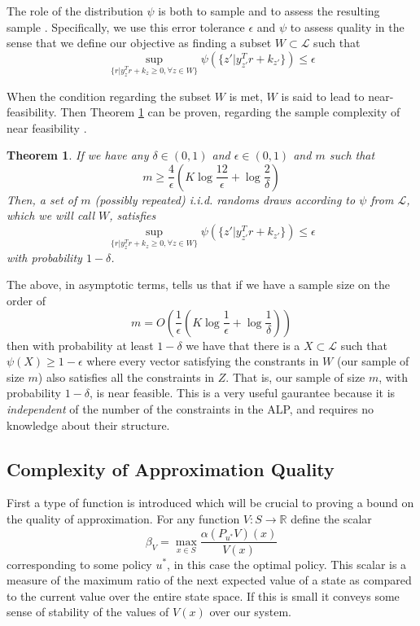 \documentclass[12pt,reqno]{amsart}
\newtheorem{thm}{Theorem}[section]
\newcommand{\R}{\ensuremath{\mathbb{R}}}
\newcommand{\sL}{\mathcal{L}}
\numberwithin{equation}{section}
\begin{document}
The role of the distribution $\psi$ is both to sample and to assess the resulting sample \cite{FV2}. Specifically, we use this error tolerance $\epsilon$ and $\psi$ to assess quality in the sense that we define our objective as finding a subset $W \subset \sL$ such that
$$
\sup_{\{r | y_z^Tr + k_z \geq 0, \forall z \in W\}} \psi(\{ z' | y_{z'}^T r + k_{z'}\}) \leq \epsilon
$$

When the condition regarding the subset $W$ is met, $W$ is said to lead to near-feasibility. Then Theorem \ref{thm:sample_complexity} can be proven, regarding the sample complexity of near feasibility \cite{FV2}.

\begin{thm}\label{thm:sample_complexity}
If we have any $\delta \in (0,1)$ and $\epsilon \in (0,1)$ and $m$ such that
$$
m \geq \frac{4}{\epsilon} (K \log \frac{12}{\epsilon} + \log \frac{2}{\delta})
$$
Then, a set of $m$ (possibly repeated) i.i.d. randoms draws according to $\psi$ from $\sL$, which we will call $W$, satisfies
$$
\sup_{\{r | y_z^Tr + k_z \geq 0, \forall z \in W\}} \psi(\{ z' | y_{z'}^T r + k_{z'}\}) \leq \epsilon
$$ 
with probability $1-\delta$.
\end{thm}

The above, in asymptotic terms, tells us that if we have a sample size on the order of
$$
m = O(\frac{1}{\epsilon}(K \log \frac{1}{\epsilon} + \log \frac{1}{\delta}))
$$
then with probability at least $1-\delta$ we have that there is a $X \subset \sL$ such that $\psi(X) \geq 1 - \epsilon$ where every vector satisfying the constrants in $W$ (our sample of size $m$) also satisfies all the constraints in $Z$. That is, our sample of size $m$, with probability $1- \delta$, is near feasible. This is a very useful gaurantee because it is {\em independent} of the number of the constraints in the ALP, and requires no knowledge about their structure.

\subsection{Complexity of Approximation Quality}
First a type of function is introduced which will be crucial to proving a bound on the quality of approximation. For any function $V: S \rightarrow \R$ define the scalar
$$
\beta_V = \max_{x \in S} \frac{\alpha(P_{u^*}V)(x)}{V(x)}
$$
corresponding to some policy $u^*$, in this case the optimal policy. This scalar is a measure of the maximum ratio of the next expected value of a state as compared to the current value over the entire state space. If this is small it conveys some sense of stability of the values of $V(x)$ over our system.
\end{document}
